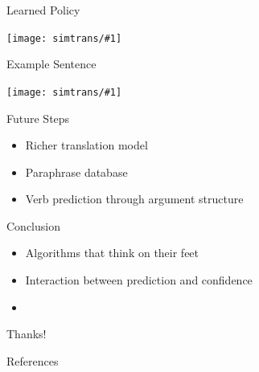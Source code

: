 \documentclass[compress]{beamer}
\newcommand{\gfxs}[2]{
\begin{center}
	\texttt{[image: simtrans/\#1]}
\end{center}
}
\begin{document}
\begin{frame}{Learned Policy}

  \gfxs{learned_policy}{.8}

\end{frame}

\begin{frame}{Example Sentence}

  \gfxs{ex_imperfect}{.7}

\end{frame}

\begin{frame}{Future Steps}

  \begin{itemize}
    \item Richer translation model
    \item Paraphrase database
    \item Verb prediction through argument structure
  \end{itemize}

\end{frame}


\begin{frame}{Conclusion}

  \begin{itemize}
    \item Algorithms that think on their feet
    \item Interaction between prediction and confidence
    \item 
  \end{itemize}

\end{frame}

\begin{frame}{Thanks!}

\end{frame}

\begin{frame}{References}

\tiny

\end{frame}




	
\end{document}
